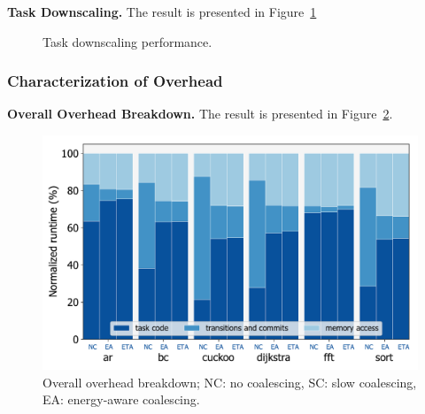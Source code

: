 \textbf{Task Downscaling.} The result is presented in Figure~\ref{fig:task_downscaling} 

\begin{figure}
	\centering
	\caption{Task downscaling performance. }
	\label{fig:task_downscaling}
\end{figure}	

\subsubsection{Characterization of \sys Overhead}
\label{sec:coala_overhead}


\indent \textbf{Overall \sys Overhead Breakdown.} The result is presented in Figure~\ref{fig:overallOverheadBreakdown}.


\begin{figure}
	\centering
	\includegraphics[width=\columnwidth]{figures/overallOverhead}
	\caption{Overall \sys overhead breakdown; NC: no coalescing, SC: slow coalescing, EA: energy-aware coalescing. }
	\label{fig:overallOverheadBreakdown}
\end{figure}

